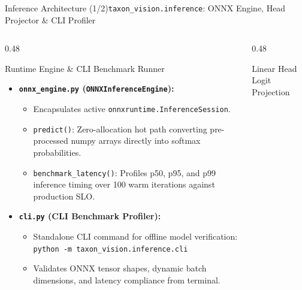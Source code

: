 \begin{frame}{Inference Architecture (1/2)}{\texttt{taxon\_vision.inference}: ONNX Engine, Head Projector \& CLI Profiler}
    \begin{columns}[T]
        \begin{column}{0.48\textwidth}
            \begin{block}{Runtime Engine \& CLI Benchmark Runner}
                \begin{itemize}\scriptsize
                    \item \textbf{\texttt{onnx\_engine.py} (\texttt{ONNXInferenceEngine}):}
                        \begin{itemize}\tiny
                            \item Encapsulates active \texttt{onnxruntime.InferenceSession}.
                            \item \texttt{predict()}: Zero-allocation hot path converting pre-processed numpy arrays directly into softmax probabilities.
                            \item \texttt{benchmark\_latency()}: Profiles p50, p95, and p99 inference timing over 100 warm iterations against production SLO.
                        \end{itemize}
                    \item \textbf{\texttt{cli.py} (CLI Benchmark Profiler):}
                        \begin{itemize}\tiny
                            \item Standalone CLI command for offline model verification:
                                \texttt{python -m taxon\_vision.inference.cli}
                            \item Validates ONNX tensor shapes, dynamic batch dimensions, and latency compliance from terminal.
                        \end{itemize}
                \end{itemize}
            \end{block}
        \end{column}
        \begin{column}{0.48\textwidth}
            \begin{block}{Linear Head Logit Projection}
                \begin{itemize}\scriptsize

\end{itemize}
\end{block}
\end{column}
\end{columns}
\end{frame}
